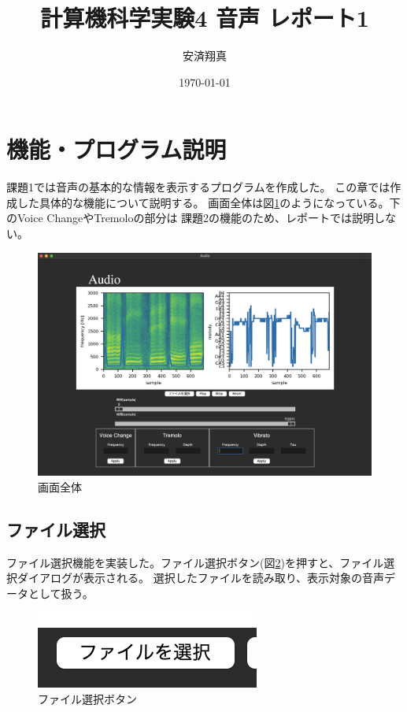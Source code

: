 \documentclass[a4paper,11pt]{jsarticle}
\begin{document}
\title{計算機科学実験4 音声 レポート1}
\author{安済翔真}
\date{\today}
\maketitle

\tableofcontents
\newpage

\section{機能・プログラム説明}

課題1では音声の基本的な情報を表示するプログラムを作成した。
この章では作成した具体的な機能について説明する。
画面全体は図\ref{fig:work2_app}のようになっている。下のVoice ChangeやTremoloの部分は
課題2の機能のため、レポートでは説明しない。

\begin{figure}[h]
\centering
\includegraphics[keepaspectratio, width=13cm]
{./images/work2_app.png}
\caption{画面全体}
\label{fig:work2_app}
\end{figure}

\subsection{ファイル選択}
ファイル選択機能を実装した。ファイル選択ボタン(図\ref{fig:select_file})を押すと、ファイル選択ダイアログが表示される。
選択したファイルを読み取り、表示対象の音声データとして扱う。

\begin{figure}[h]
\centering
\includegraphics[keepaspectratio, scale = 1.0]
{./images/select_file.png}
\caption{ファイル選択ボタン}
\label{fig:select_file}
\end{figure}
\end{document}
